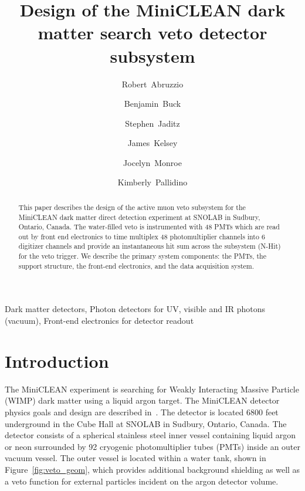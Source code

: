 \documentclass[review,number,sort&compress]{elsarticle}
\begin{document}
\begin{frontmatter}
\title{Design of the MiniCLEAN dark matter search veto detector subsystem}
\author[mit]{Robert~Abruzzio}
\author[mit]{Benjamin~Buck}
\author[lanl]{Stephen~Jaditz}
\author[mit]{James~Kelsey}
\author[rhul]{Jocelyn~Monroe}
\author[sno]{Kimberly~Pallidino}
\address[lanl]{Los Alamos National Laboratory, Los Alamos, NM, USA}
\address[mit]{Massachusetts Institute of Technology, Cambridge, MA, USA}
\address[rhul]{Royal Holloway University of London, Egham, Surrey, UK}
\address[sno]{SNOLAB, Lively, Ontario, CA}
%
\begin{abstract}
This paper describes the design of the active muon veto subsystem for
the MiniCLEAN dark matter direct detection experiment at SNOLAB in Sudbury,
Ontario, Canada. The water-filled veto is instrumented with 48 PMTs which are
read out by front end electronics to time multiplex 48 photomultiplier channels
into 6 digitizer channels and provide an instantaneous hit sum across the
subsystem (N-Hit) for the veto trigger. We describe the primary system components:
the PMTs, the support structure, the front-end electronics, and the data acquisition system.
\end{abstract}
\begin{keyword}
Dark matter detectors, Photon detectors for UV, visible and IR photons (vacuum), Front-end electronics for detector readout
\end{keyword}
\end{frontmatter}
\linenumbers
%
\section{Introduction}
\label{Introduction}
The MiniCLEAN experiment is searching for Weakly Interacting Massive Particle
(WIMP) dark matter using a liquid argon target. The MiniCLEAN detector
physics goals and design are described in~\cite{ref:miniclean_physics}. The
detector is located 6800 feet underground in the Cube Hall at SNOLAB in
Sudbury, Ontario, Canada. The detector consists of a spherical stainless
steel inner vessel containing liquid argon or neon surrounded by 92 cryogenic
photomultiplier tubes (PMTs) inside an outer vacuum vessel. The outer vessel
is located within a water tank, shown in Figure~\ref{fig:veto_geom}, which
provides additional background shielding as well as a veto function for
external particles incident on the argon detector volume. 
\end{document}
